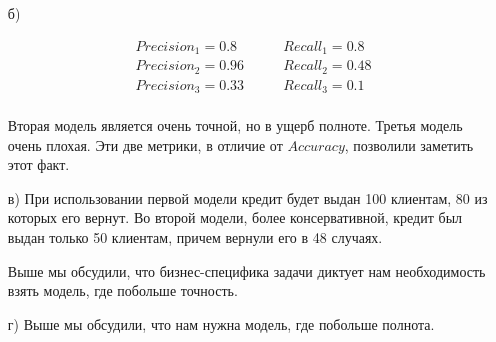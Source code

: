 \documentclass[12pt, a4paper, oneside]{article}
\begin{document}
{\begin{enumerate}
		За полноту будет отвечать первы столбец
		
		\[Recall = \frac{TP}{TP + FN}.\]
		
		Посмотрим ещё один пример: если мы решаем задачу крединтого скоринга, нам нужно получить деньги назад после выдачи кредитов, иначе мы разоримся. Нам нужна модель, которая будет точно определять надёжного заёмщика. В этой ситуации для нас неважно покрыть все вражеские истребители снарядами (выдать кредиты каждому надёжному заёмщику), для нас важно сделать это точно. Поэтому основное внимание мы уделяем ошибке $FP$. 
		
		Если мы пытаемся найти больных больной болезнью с болью и отправить их делать дополнительные анализы, для нас страшнее $FN$ ошибка. Если мы отправим лишнего человека на анализы, ничего страшного с ним не произойдёт. Если мы забудем проверить больного, он умрёт. Тут лучше добиться высокой полноты, при небольшой точности. 
		
		В разных ситуациях ошибки имеют разные цены. $Accuracy$ не видит этого, поэтому на практике обычно используют $Precision$ и $Recall$. 
		
		\item[б)]  
		
		\begin{equation} 
		\begin{aligned}
		&Precision_1 =  0.8   \qquad &Recall_1 = 0.8 \\ 
		&Precision_2 = 0.96  \qquad &Recall_2 = 0.48 \\ 
		&Precision_3 = 0.33  \qquad &Recall_3 = 0.1  \\
		\end{aligned}
		\end{equation} 
		
		Вторая модель является очень точной, но в ущерб полноте. Третья модель очень плохая. Эти две метрики, в отличие от $Accuracy$, позволили заметить этот факт. 
		
		\item[в)] При использовании первой модели кредит будет выдан 100 клиентам, 80 из которых его вернут. Во второй модели, более консервативной, кредит был выдан только 50 клиентам, причем вернули его в 48 случаях. 
		
		Выше мы обсудили, что бизнес-специфика задачи диктует нам необходимость взять модель, где побольше точность.
		
		\item[г)]  Выше мы обсудили, что нам нужна модель, где побольше полнота.
	\end{enumerate}
}
\end{document}
